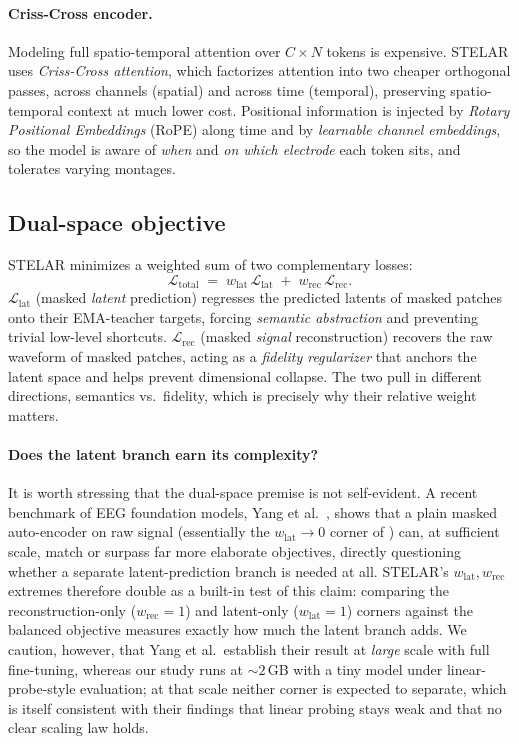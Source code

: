 \documentclass[11pt]{article}
\newcommand{\Llat}{\mathcal{L}_{\mathrm{lat}}}
\newcommand{\Lrec}{\mathcal{L}_{\mathrm{rec}}}
\newcommand{\Ltot}{\mathcal{L}_{\mathrm{total}}}
\newcommand{\wlat}{w_{\mathrm{lat}}}
\newcommand{\wrec}{w_{\mathrm{rec}}}
\begin{document}
\paragraph{Criss-Cross encoder.} Modeling full spatio-temporal attention over
\(C\times N\) tokens is expensive. STELAR uses \emph{Criss-Cross
attention}, which factorizes attention into two cheaper
orthogonal passes, across channels (spatial) and across time (temporal),
preserving spatio-temporal context at much lower cost. Positional information is
injected by \emph{Rotary Positional Embeddings} (RoPE) along time and by
\emph{learnable channel embeddings}, so the model is aware of \emph{when} and
\emph{on which electrode} each token sits, and tolerates varying montages.

\subsection{Dual-space objective}
STELAR minimizes a weighted sum of two complementary losses:
\begin{equation}
\Ltot \;=\; \wlat \,\Llat \;+\; \wrec \,\Lrec .
\label{eq:dual}
\end{equation}
\(\Llat\) (masked \emph{latent} prediction) regresses the predicted latents of
masked patches onto their EMA-teacher targets, forcing \emph{semantic
abstraction} and preventing trivial low-level shortcuts. \(\Lrec\) (masked
\emph{signal} reconstruction) recovers the raw waveform of masked patches, acting
as a \emph{fidelity regularizer} that anchors the latent space and helps prevent
dimensional collapse. The two pull in different directions, semantics vs.\
fidelity, which is precisely why their relative weight matters.

\paragraph{Does the latent branch earn its complexity?} It is worth stressing
that the dual-space premise is not self-evident. A recent benchmark of EEG
foundation models, Yang et al.~\cite{yang2026eegfm}, shows that a plain masked
auto-encoder on raw signal (essentially the \(\wlat\!\to\!0\) corner of
\Cref{eq:dual}) can, at sufficient scale, match or surpass far more elaborate
objectives, directly questioning whether a separate latent-prediction branch is
needed at all. STELAR's \(\wlat,\wrec\) extremes therefore double as a built-in
test of this claim: comparing the reconstruction-only (\(\wrec\!=\!1\)) and
latent-only (\(\wlat\!=\!1\)) corners against the balanced objective measures
exactly how much the latent branch adds. We caution, however, that Yang et
al.\ establish their result at \emph{large} scale with full fine-tuning, whereas
our study runs at \(\sim\!2\)\,GB with a tiny model under linear-probe-style
evaluation; at that scale neither corner is expected to separate, which is itself
consistent with their findings that linear probing stays weak and that no clear
scaling law holds.
\end{document}

